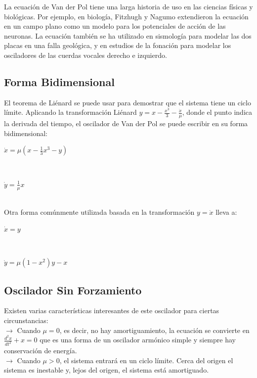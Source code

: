 \documentclass[12pt]{article}
\begin{document}
La ecuación de Van der Pol tiene una larga historia de uso en las ciencias físicas y biológicas. Por ejemplo, en biología, Fitzhugh y Nagumo extendieron la ecuación en un campo plano como un modelo para los potenciales de acción de las neuronas. La ecuación también se ha utilizado en sismología para modelar las dos placas en una falla geológica, y en estudios de la fonación para modelar los osciladores de las cuerdas vocales derecho e izquierdo.




\subsection*{Forma Bidimensional}
El teorema de Liénard se puede usar para demostrar que el sistema tiene un ciclo límite. Aplicando la transformación Liénard $\displaystyle y = x - \frac{x^3}{3}- \frac{\dot x}{\mu}$, donde el punto indica la derivada del tiempo, el oscilador de Van der Pol se puede escribir en su forma bidimensional: \\

\centerline{$\displaystyle \dot x = \mu (x- \frac{1}{3}x^3 - y) $}
$ $\\
\centerline{$\displaystyle \dot y= \frac{1}{\mu}x$}\\

Otra forma comúnmente utilizada basada en la transformación $y = \dot x$ lleva a:\\
\centerline{$\dot x = y$}\\
\centerline{$\dot y = \mu (1-x^2)y-x$}




\subsection*{Oscilador Sin Forzamiento}
Existen varias características interesantes de este oscilador para ciertas circunstancias:\\

$\to$ Cuando $\mu=0$, es decir, no hay amortiguamiento, la ecuación se convierte en $\displaystyle \frac{d^2x}{dt^2}+x = 0$ que es una forma de un oscilador armónico simple y siempre hay conservación de energía.\\

$\to$ Cuando $\mu>0$, el sistema entrará en un ciclo límite. Cerca del origen el sistema es inestable y, lejos del origen, el sistema está amortiguado.\\
\end{document}
